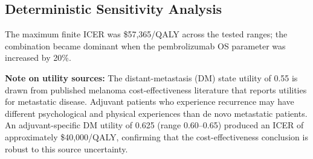 \documentclass[11pt,a4paper]{article}
\begin{document}
\subsection{Deterministic Sensitivity Analysis}
\label{sec:dsa}
\begin{table}[H]
\centering
\caption{One-Way Deterministic Sensitivity Analysis}
\label{tab:s11}
\end{table}
\noindent The maximum finite ICER was \$57,365/QALY across the tested ranges; the combination became dominant when the \mbox{pembrolizumab} OS parameter was increased by 20\%.

\noindent\textbf{Note on utility sources:} The distant-metastasis (DM) state utility of 0.55 is drawn from published melanoma cost-effectiveness literature that reports utilities for metastatic disease. Adjuvant patients who experience recurrence may have different psychological and physical experiences than de novo metastatic patients. An adjuvant-specific DM utility of 0.625 (range 0.60--0.65) produced an ICER of approximately \$40,000/QALY, confirming that the cost-effectiveness conclusion is robust to this source uncertainty.
\end{document}
